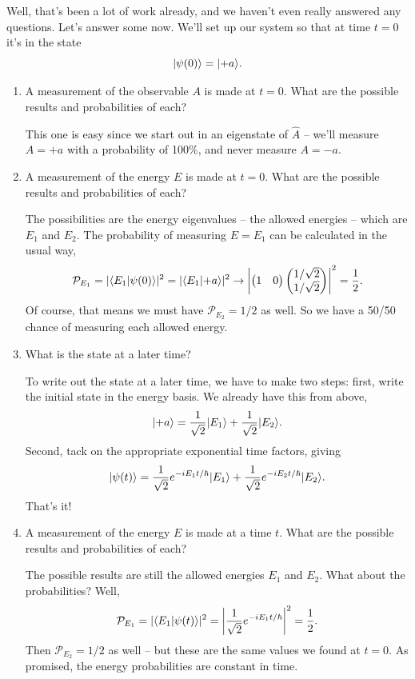 \begin{example}
Well, that's been a lot of work already, and we haven't even really answered any questions.  Let's answer some now.  We'll set up our system so that at time $t=0$ it's in the state
\[
| \psi(0) \rangle = | {+}a \rangle.
\]

 \begin{enumerate}[label=(\alph*)]
 \item A measurement of the observable $A$ is made at $t=0$.  What are the possible results and probabilities of each?

This one is easy since we start out in an eigenstate of $\hat{A}$ -- we'll measure $A = +a$ with a probability of 100\%, and never measure $A = -a$.

 \item  A measurement of the energy $E$ is made at $t=0$.  What are the possible results and probabilities of each?

The possibilities are the energy eigenvalues -- the allowed energies -- which are $E_1$ and $E_2$.  The probability of measuring $E = E_1$ can be calculated in the usual way,
\[
\mathcal{P}_{E_1} = | \langle E_1 | \psi(0) \rangle|^2 = | \langle E_1 | {+}a \rangle|^2 \to \left| \begin{pmatrix} 1 & 0 \end{pmatrix} \begin{pmatrix} 1/\sqrt{2} \\ 1/\sqrt{2} \end{pmatrix} \right|^2 = \frac{1}{2}.
\]
Of course, that means we must have $\mathcal{P}_{E_2} = 1/2$ as well.  So we have a 50/50 chance of measuring each allowed energy.

\item What is the state at a later time?

To write out the state at a later time, we have to make two steps:  first, write the initial state in the energy basis.  We already have this from above,
\[
| {+}a \rangle = \frac{1}{\sqrt{2}} | E_1 \rangle + \frac{1}{\sqrt{2}} | E_2 \rangle.
\]
Second, tack on the appropriate exponential time factors, giving
\[
| \psi(t) \rangle = \frac{1}{\sqrt{2}} e^{-iE_1t/\hbar} | E_1 \rangle + \frac{1}{\sqrt{2}} e^{-iE_2t/\hbar}  | E_2 \rangle.
\]
That's it!

\item A measurement of the energy $E$ is made at a time $t$.  What are the possible results and probabilities of each?

The possible results are still the allowed energies $E_1$ and $E_2$.  What about the probabilities?  Well,
\[
\mathcal{P}_{E_1} = | \langle E_1 | \psi(t) \rangle|^2 = \left| \frac{1}{\sqrt{2}} e^{-iE_1t/\hbar} \right|^2 = \frac{1}{2}.
\]
Then $\mathcal{P}_{E_2} = 1/2$ as well -- but these are the same values we found at $t=0$.  As promised, the energy probabilities are constant in time.


\end{enumerate}
\end{example}
